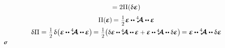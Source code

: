 \begin{otherlanguage}{russian}
\begin{equation*}
\begin{gathered}
= 2 \potential(\variation{\infinitesimaldeformation})
\\[.3em]
%
\potential(\hspace{-0.1ex}\infinitesimaldeformation\hspace{-0.1ex}) \hspace{-0.2ex}
= \hspace{.1ex} \smash{\smalldisplaystyleonehalf} \infinitesimaldeformation \hspace{-0.1ex} \dotdotp \hspace{-0.1ex} \stiffnesstensor \dotdotp \hspace{-0.1ex} \infinitesimaldeformation
\\[.2em]
%
\variation{\potential}
= \hspace{.1ex} \smash{\smalldisplaystyleonehalf} \hspace{.25ex} \variation{ \bigl( \infinitesimaldeformation \hspace{-0.1ex} \dotdotp \hspace{-0.1ex} \stiffnesstensor \dotdotp \hspace{-0.1ex} \infinitesimaldeformation \bigr) } \hspace{-0.25ex}
= \hspace{.1ex} \smash{\smalldisplaystyleonehalf} \hspace{-0.1ex} \bigl( \scalebox{0.95}{$ \variation{\infinitesimaldeformation} \hspace{-0.1ex} \dotdotp \hspace{-0.1ex} \stiffnesstensor \dotdotp \hspace{-0.1ex} \infinitesimaldeformation + \infinitesimaldeformation \hspace{-0.1ex} \dotdotp \hspace{-0.1ex} \stiffnesstensor \dotdotp \variation{\infinitesimaldeformation} $} \bigr) \hspace{-0.25ex}
= \tikzmark{beginLinearStressAsDeformationAndStiffness} \infinitesimaldeformation \hspace{-0.1ex} \dotdotp \hspace{-0.1ex} \stiffnesstensor \tikzmark{endLinearStressAsDeformationAndStiffness} \dotdotp \variation{\infinitesimaldeformation}
\end{gathered}
\end{equation*}%
%
{${\scalebox{0.8}{$ \linearstress $}}$}
\vspace{.1em}


\end{otherlanguage}
